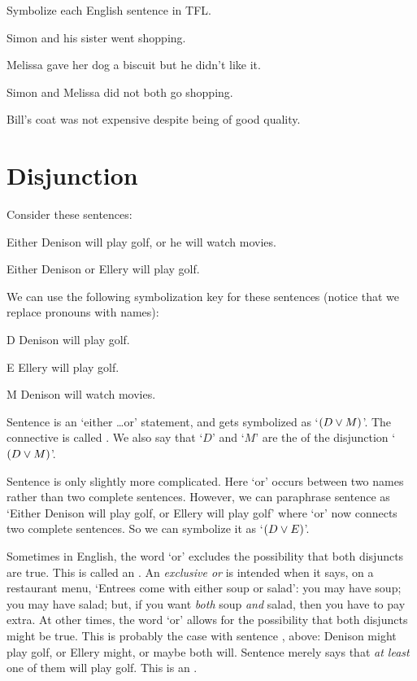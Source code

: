 \practiceproblems
\problempart Symbolize each English sentence in TFL.

\begin{earg}
\item Simon and his sister went shopping.
\item Melissa gave her dog a biscuit but he didn't like it.
\item Simon and Melissa did not both go shopping.
\item Bill's coat was not expensive despite being of good quality.
\end{earg}

\section{Disjunction}\label{s:Disjunction}
Consider these sentences:
	\begin{earg}
		\item[\ex{or1}]Either Denison will play golf, or he will watch movies.
		\item[\ex{or2}]Either Denison or Ellery will play golf.
	\end{earg}
We can use the following symbolization key for these sentences (notice that we replace pronouns with names):
	\begin{ekey}
		\item[D] Denison will play golf.
		\item[E] Ellery will play golf.
		\item[M] Denison will watch movies.
	\end{ekey}
Sentence  is an `either \ldots or' statement, and gets symbolized as `$(D \vee M)$'. The connective is called . We also say that `$D$' and `$M$' are the  of the disjunction `$(D \vee M)$'.

Sentence  is only slightly more complicated.  Here `or' occurs between two names rather than two complete sentences. However, we can paraphrase sentence  as `Either Denison will play golf, or Ellery will play golf' where `or' now connects two complete sentences. So we can symbolize it as `$(D \vee E)$'.


Sometimes in English, the word `or' excludes the possibility that both disjuncts are true. This is called an .  An \emph{exclusive or} is  intended when it says, on a restaurant menu, `Entrees come with either soup or salad': you may have soup; you may have salad; but, if you want \emph{both} soup \emph{and} salad, then you have to pay extra.  At other times, the word `or' allows for the possibility that both disjuncts might be true. This is probably the case with sentence , above: Denison might play golf, or Ellery might, or maybe both will. Sentence  merely says that \emph{at least} one of them will play golf. This is an .

